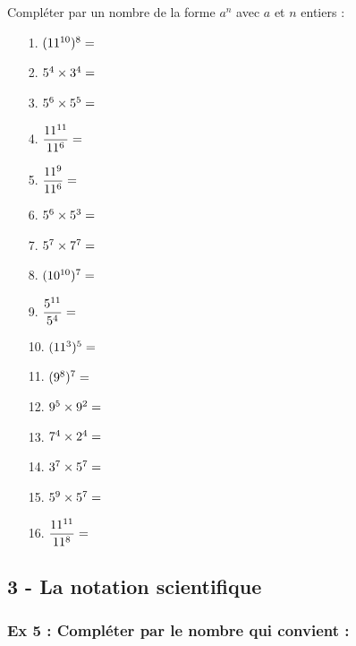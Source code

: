 \documentclass[12pt]{article}
\begin{document}
Compléter par un nombre de la forme $a^n$ avec $a$ et $n$ entiers :

\begin{multicols}{4}
  \begin{enumerate}
  \item[1.] $(11^{10})^{8} = \dotfill$
  \item[2.] $5^{4}  \times  3^{4}  =  \dotfill$
  \item[3.] $5^{6} \times 5^{5} = \dotfill$
  \item[4.] $\dfrac{11^{11}}{11^{6}} = \dotfill$
  \item[5.] $\dfrac{11^{9}}{11^{6}} = \dotfill$
  \item[6.] $5^{6} \times 5^{3} = \dotfill$
  \item[7.] $5^{7}  \times  7^{7}  =  \dotfill$
  \item[8.] $(10^{10})^{7} = \dotfill$
  \item[9.] $\dfrac{5^{11}}{5^{4}} = \dotfill$
  \item[10.] $(11^{3})^{5} = \dotfill$
  \item[11.] $(9^{8})^{7} = \dotfill$
  \item[12.] $9^{5} \times 9^{2} = \dotfill$
  \item[13.] $7^{4}  \times  2^{4}  =  \dotfill$
  \item[14.] $3^{7}  \times  5^{7}  =  \dotfill$
  \item[15.] $5^{9} \times 5^{7} = \dotfill$
  \item[16.] $\dfrac{11^{11}}{11^{8}} = \dotfill$
  \end{enumerate}
\end{multicols}

\newpage

\subsection*{3 - La notation scientifique}

\subsubsection*{Ex 5 : Compléter par le nombre qui convient :}
\end{document}
